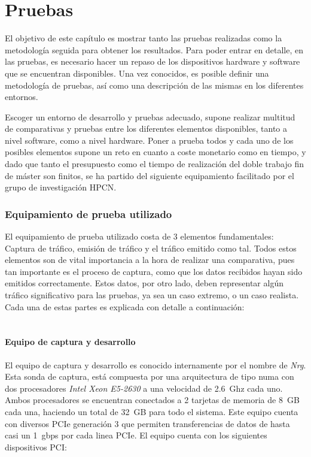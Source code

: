 \chapter{Pruebas\label{sec:desarrollo}}

El objetivo de este capítulo es mostrar tanto las pruebas realizadas como la metodología seguida para obtener los resultados.
Para poder entrar en detalle, en las pruebas, es necesario hacer un repaso de los dispositivos hardware y software que se encuentran disponibles. Una vez conocidos, es posible definir una metodología de pruebas, así como una descripción de las mismas en los diferentes entornos.


Escoger un entorno de desarrollo y pruebas adecuado, supone realizar multitud de comparativas y pruebas entre los diferentes elementos disponibles, tanto a nivel software, como a nivel hardware.
Poner a prueba todos y cada uno de los posibles elementos supone un reto en cuanto a coste monetario como en tiempo, y dado que tanto el presupuesto como el tiempo de realización del doble trabajo fin de máster son finitos, se ha partido del siguiente equipamiento facilitado por el grupo de investigación HPCN.

\subsection{Equipamiento de prueba utilizado\label{sec:equipamiento}}

El equipamiento de prueba utilizado costa de 3 elementos fundamentales: Captura de tráfico, emisión de tráfico y el tráfico emitido como tal.
Todos estos elementos son de vital importancia a la hora de realizar una comparativa, pues tan importante es el proceso de captura, como que los datos recibidos hayan sido emitidos correctamente. Estos datos, por otro lado, deben representar algún tráfico significativo para las pruebas, ya sea un caso extremo, o un caso realista. Cada una de estas partes es explicada con detalle a continuación:
\\
\\

\subsubsection{Equipo de captura y desarrollo}

El equipo de captura y desarrollo es conocido internamente por el nombre de \textit{Nrg}.
Esta sonda de captura, está compuesta por una arquitectura de tipo \gls{numa} con dos procesadores \textit{Intel Xeon E5-2630} a una velocidad de 2.6~Ghz cada uno.
Ambos procesadores se encuentran conectados a 2 tarjetas de memoria de 8~GB cada una, haciendo un total de 32~GB para todo el sistema.
Este equipo cuenta con diversos PCIe generación 3 que permiten transferencias de datos de hasta casi un 1~\gls{gbps} por cada linea PCIe. El equipo cuenta con los siguientes dispositivos PCI:

